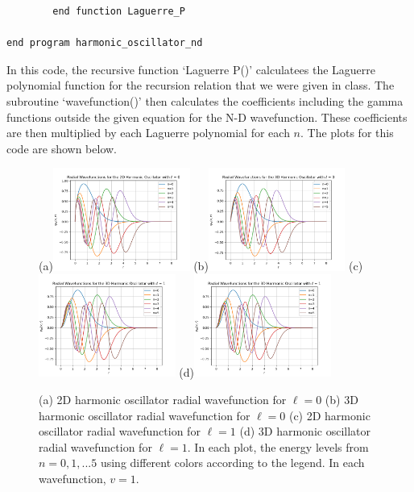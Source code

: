 \documentclass[12pt]{article}
\begin{document}
\begin{enumerate}
\begin{verbatim}
        end function Laguerre_P

end program harmonic_oscillator_nd
\end{verbatim}

In this code, the recursive function `Laguerre P()' calculatees the Laguerre polynomial function for the recursion relation that we were given in class. 
The subroutine `wavefunction()' then calculates the coefficients including the gamma functions outside the given equation for the N-D wavefunction. These
coefficients are then multiplied by each Laguerre polynomial for each $n$. The plots for this code are shown below.
\begin{figure}[h!]
    \centering
    \subfigure(a){\includegraphics[width=0.4\textwidth]{./Problem_2/plots/Wf_0l_2-D.png}} 
    \subfigure(b){\includegraphics[width=0.4\textwidth]{./Problem_2/plots/Wf_0l_3-D.png}} 
    \subfigure(c){\includegraphics[width=0.4\textwidth]{./Problem_2/plots/Wf_1l_3-D.png}}
    \subfigure(d){\includegraphics[width=0.4\textwidth]{./Problem_2/plots/Wf_1l_3-D.png}}
    \caption{(a) 2D harmonic oscillator radial wavefunction for $\ell=0$ (b) 3D harmonic oscillator radial wavefunction for $\ell=0$ (c) 2D harmonic oscillator radial wavefunction for $\ell=1$  (d) 3D harmonic oscillator radial wavefunction for $\ell=1$.  
    In each plot, the energy levels from $n=0,1,...5$ using different colors according to the legend. In each wavefunction, $v=1$.}
    \label{fig:foobar}
\end{figure}


\end{enumerate}
\end{document}
